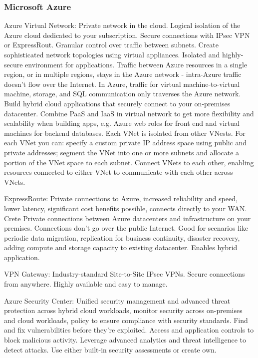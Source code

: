\subsubsection{Microsoft Azure}
Azure Virtual Network: Private network in the cloud. Logical isolation of the Azure cloud dedicated to your subscription. Secure connections with IPsec VPN or ExpressRout. Granular control over traffic between subnets. Create sophisticated network topologies using virtual appliances. Isolated and highly-secure environment for applications. Traffic between Azure resources in a single region, or in multiple regions, stays in the Azure network - intra-Azure traffic doesn't flow over the Internet. In Azure, traffic for virtual machine-to-virtual machine, storage, and SQL communication only traverses the Azure network. Build hybrid cloud applications that securely connect to your on-premises datacenter. Combine PaaS and IaaS in virtual network to get more flexibility and scalability when building apps, e.g. Azure web roles for front end and virtual machines for backend databases. Each VNet is isolated from other VNests. For each VNet you can: specify a custom private IP address space using public and private addresses; segment the VNet into one or more subnets and allocate a portion of the VNet space to each subnet. Connect VNets to each other, enabling resources connected to either VNet to communicate with each other across VNets. 

ExpressRoute: Private connections to Azure, increased reliability and speed, lower latency, significant cost benefits possible, connects directly to your WAN. Crete Private connections between Azure datacenters and infrastructure on your premises. Connections don't go over the public Internet. Good for scenarios like periodic data migration, replication for business continuity, disaster recovery, adding compute and storage capacity to existing datacenter. Enables hybrid application. 

VPN Gateway: Industry-standard Site-to-Site IPsec VPNs. Secure connections from anywhere. Highly available and easy to manage. 

Azure Security Center: Unified security management and advanced threat protection across hybrid cloud workloads, monitor security across on-premises and cloud workloads, policy to ensure compliance with security standards. Find and fix vulnerabilities before they're exploited. Access and application controls to block malicious activity. Leverage advanced analytics and threat intelligence to detect attacks. Use either built-in security assessments or create own. 

